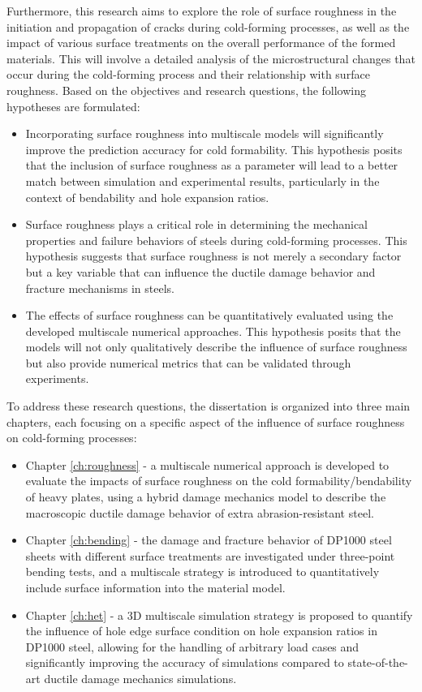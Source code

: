 Furthermore, this research aims to explore the role of surface roughness in the initiation and propagation of cracks during cold-forming processes, as well as the impact of various surface treatments on the overall performance of the formed materials. This will involve a detailed analysis of the microstructural changes that occur during the cold-forming process and their relationship with surface roughness.
Based on the objectives and research questions, the following hypotheses are formulated:
\begin{itemize}
\item Incorporating surface roughness into multiscale models will significantly improve the prediction accuracy for cold formability. This hypothesis posits that the inclusion of surface roughness as a parameter will lead to a better match between simulation and experimental results, particularly in the context of bendability and hole expansion ratios.
\item Surface roughness plays a critical role in determining the mechanical properties and failure behaviors of steels during cold-forming processes. This hypothesis suggests that surface roughness is not merely a secondary factor but a key variable that can influence the ductile damage behavior and fracture mechanisms in steels.
\item The effects of surface roughness can be quantitatively evaluated using the developed multiscale numerical approaches. This hypothesis posits that the models will not only qualitatively describe the influence of surface roughness but also provide numerical metrics that can be validated through experiments.
\end{itemize}
To address these research questions, the dissertation is organized into three main chapters, each focusing on a specific aspect of the influence of surface roughness on cold-forming processes:
\begin{itemize}
\item Chapter \ref{ch:roughness} - a multiscale numerical approach is developed to evaluate the impacts of surface roughness on the cold formability/bendability of heavy plates, using a hybrid damage mechanics model to describe the macroscopic ductile damage behavior of extra abrasion-resistant steel.
\item Chapter \ref{ch:bending} - the damage and fracture behavior of DP1000 steel sheets with different surface treatments are investigated under three-point bending tests, and a multiscale strategy is introduced to quantitatively include surface information into the material model.
\item Chapter \ref{ch:het} - a 3D multiscale simulation strategy is proposed to quantify the influence of hole edge surface condition on hole expansion ratios in DP1000 steel, allowing for the handling of arbitrary load cases and significantly improving the accuracy of simulations compared to state-of-the-art ductile damage mechanics simulations.
\end{itemize}

